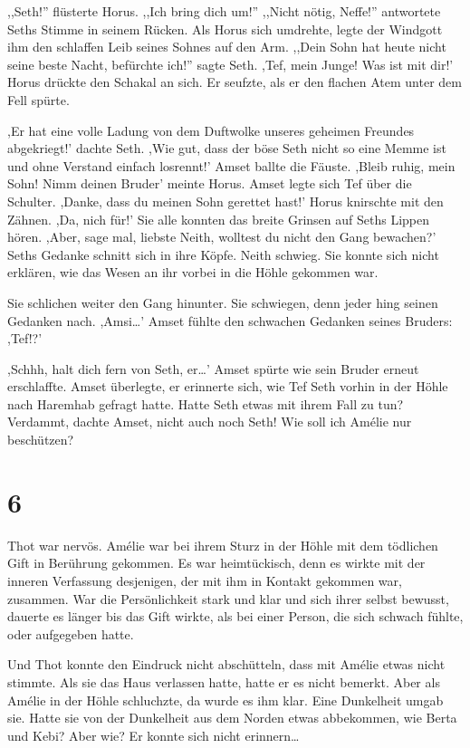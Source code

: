 \documentclass[11pt,titlepage,a5paper]{book}
\newcommand{\am}{Amélie }
\begin{document}
,,Seth!'' flüsterte Horus. ,,Ich bring dich um!'' ,,Nicht nötig, Neffe!'' antwortete Seths Stimme in seinem Rücken. Als Horus sich umdrehte, legte der Windgott ihm den schlaffen Leib seines Sohnes auf den Arm. ,,Dein Sohn hat heute nicht seine beste Nacht, befürchte ich!'' sagte Seth. ,Tef, mein Junge! Was  ist mit dir!' Horus drückte den Schakal an sich. Er seufzte, als er den flachen Atem unter dem Fell spürte.

,Er hat eine volle Ladung von dem Duftwolke unseres geheimen Freundes abgekriegt!' dachte Seth. ,Wie gut, dass der böse Seth nicht so eine Memme ist und ohne Verstand einfach losrennt!' Amset ballte die Fäuste. ,Bleib ruhig, mein Sohn! Nimm deinen Bruder' meinte Horus. Amset legte sich Tef über die Schulter. ,Danke, dass du meinen Sohn gerettet hast!' Horus knirschte mit den Zähnen. ,Da, nich für!' Sie alle konnten das breite Grinsen auf Seths Lippen hören. ,Aber, sage mal, liebste Neith, wolltest du nicht den Gang bewachen?' Seths Gedanke schnitt sich in ihre Köpfe. Neith schwieg. Sie konnte sich nicht erklären, wie das Wesen an ihr vorbei in die Höhle gekommen war. 

Sie schlichen weiter den Gang hinunter. Sie schwiegen, denn jeder hing seinen Gedanken nach. ,Amsi\dots ' Amset fühlte den schwachen Gedanken seines Bruders: ,Tef!?'

,Schhh, halt dich fern von Seth, er\dots ' Amset spürte wie sein Bruder erneut erschlaffte. Amset überlegte, er erinnerte sich, wie Tef Seth vorhin in der Höhle nach Haremhab gefragt hatte. Hatte Seth etwas mit ihrem Fall zu tun? Verdammt, dachte Amset, nicht auch noch Seth! Wie soll ich \am nur beschützen?

\section*{6}

Thot war nervös. \am war bei ihrem Sturz in der Höhle mit dem tödlichen Gift in Berührung gekommen. Es war heimtückisch, denn es wirkte mit der inneren Verfassung desjenigen, der mit ihm in Kontakt gekommen war, zusammen. War die Persönlichkeit stark und klar und sich ihrer selbst bewusst, dauerte es länger bis das Gift wirkte, als bei einer Person, die sich  schwach fühlte, oder aufgegeben hatte.

Und Thot konnte den Eindruck nicht abschütteln, dass mit \am etwas nicht stimmte. Als sie das Haus verlassen hatte, hatte er es nicht bemerkt. Aber als \am in der Höhle schluchzte, da wurde es ihm klar. Eine Dunkelheit umgab sie. Hatte sie von der Dunkelheit aus dem Norden etwas abbekommen, wie Berta und Kebi? Aber wie? Er konnte sich nicht erinnern\dots 
\end{document}
